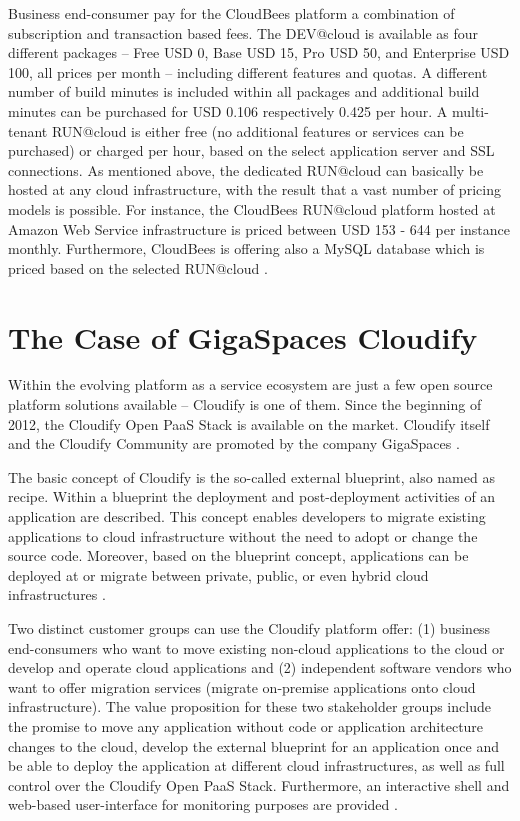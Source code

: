 Business end-consumer pay for the CloudBees platform a combination of subscription and transaction based fees. The DEV@cloud is available as four different packages -- Free USD 0, Base USD 15, Pro USD 50, and Enterprise USD 100, all prices per month -- including different features and quotas. A different number of build minutes is included within all packages and additional build minutes can be purchased for USD 0.106 respectively 0.425 per hour. A multi-tenant RUN@cloud is either free (no additional features or services can be purchased) or charged per hour, based on the select application server and SSL connections. As mentioned above, the dedicated RUN@cloud can basically be hosted at any cloud infrastructure, with the result that a vast number of pricing models is possible. For instance, the CloudBees RUN@cloud platform hosted at Amazon Web Service infrastructure is priced between USD 153 - 644 per instance monthly. Furthermore, CloudBees is offering also a MySQL database which is priced based on the selected RUN@cloud \citep{CloudBees2013}.



\section{The Case of GigaSpaces Cloudify}\label{ch:sota:gsc}

Within the evolving platform as a service ecosystem are just a few open source platform solutions available -- Cloudify is one of them. Since the beginning of 2012, the Cloudify Open PaaS Stack is available on the market. Cloudify itself and the Cloudify Community are promoted by the company GigaSpaces \citep{GigaSpaces2013a}.

The basic concept of Cloudify is the so-called external blueprint, also named as recipe. Within a blueprint the deployment and post-deployment activities of an application are described. This concept enables developers to migrate existing applications to cloud infrastructure without the need to adopt or change the source code. Moreover, based on the blueprint concept, applications can be deployed at or migrate between private, public, or even hybrid cloud infrastructures \citep{GigaSpaces2013a}.

Two distinct customer groups can use the Cloudify platform offer: (1) business end-consumers who want to move existing non-cloud applications to the cloud or develop and operate cloud applications and (2) independent software vendors who want to offer migration services (migrate on-premise applications onto cloud infrastructure). The value proposition for these two stakeholder groups include the promise to move any application without code or application architecture changes to the cloud, develop the external blueprint for an application once and be able to deploy the application at different cloud infrastructures, as well as full control over the Cloudify Open PaaS Stack. Furthermore, an interactive shell and web-based user-interface for monitoring purposes are provided \citep{GigaSpaces2013a}.

